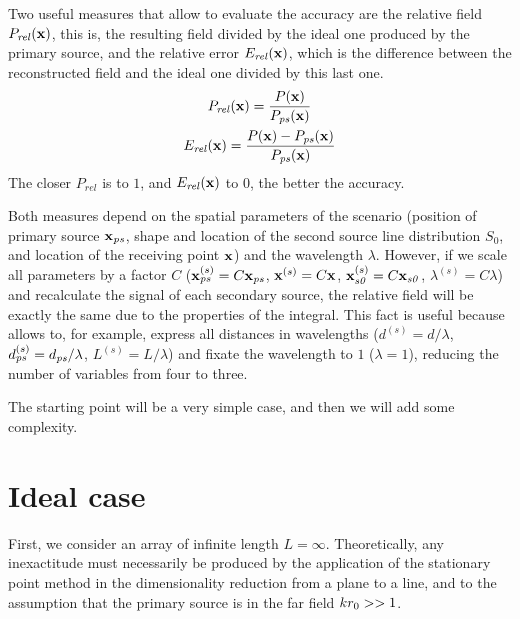 Two useful measures that allow to evaluate the accuracy are the relative field $P_\mathit{rel}(\PosTheo)$, this is, the resulting field divided by the ideal one produced by the primary source, and the relative error $E_\mathit{rel}(\PosTheo)$, which is the difference between the reconstructed field and the ideal one divided by this last one.
\begin{gather}
	P_\mathit{rel}(\PosTheo) = \frac{P(\PosTheo)}{P_{\PosTheoSubInd[primarySource]}(\PosTheo)} \\
	E_\mathit{rel}(\PosTheo) = \frac{P(\PosTheo) - P_{\PosTheoSubInd[primarySource]}(\PosTheo)}{P_{\PosTheoSubInd[primarySource]}(\PosTheo)}
\end{gather}
The closer $P_\mathit{rel}$ is to $1$, and $E_\mathit{rel}(\PosTheo)$ to $0$, the better the accuracy.

Both measures depend on the spatial parameters of the scenario (position of primary source $\PosTheo[primarySource]$, shape and location of the second source line distribution $S_0$, and location of the receiving point $\PosTheo$) and the wavelength $\lambda$. However, if we scale all parameters by a factor $C$ ($\PosTheo[primarySource]^{(s)} = C \PosTheo[primarySource]$, $\PosTheo^{(s)} = C\PosTheo$, $\PosTheo[section]^{(s)} = C\PosTheo[section]$, $\lambda^{(s)} = C\lambda$) and recalculate the signal of each secondary source, the relative field will be exactly the same due to the properties of the integral. This fact is useful because allows to, for example, express all distances in wavelengths ($d^{(s)} = d/\lambda$, $d_{\PosTheoSubInd[primarySource]}^{(s)} = d_{\PosTheoSubInd[primarySource]}/\lambda$, $L^{(s)} = L/\lambda$) and fixate the wavelength to $1$ ($\lambda = 1$), reducing the number of variables from four to three. 

The starting point will be a very simple case, and then we will add some complexity.

\section{Ideal case}
First, we consider an array of infinite length $L=\infty$.
Theoretically, any inexactitude must necessarily be produced by the application of the stationary point method in the dimensionality reduction from a plane to a line, and to the assumption that the primary source is in the far field $kr_0 >> 1$.

